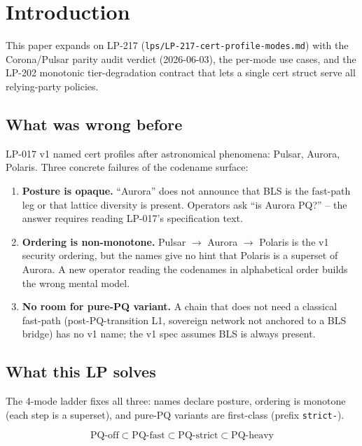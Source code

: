 \section{Introduction}

This paper expands on LP-217
(\texttt{lps/LP-217-cert-profile-modes.md}) with the Corona/Pulsar
parity audit verdict (2026-06-03), the per-mode use cases, and the
LP-202 monotonic tier-degradation contract that lets a single cert
struct serve all relying-party policies.

\subsection{What was wrong before}

LP-017 v1 named cert profiles after astronomical phenomena: Pulsar,
Aurora, Polaris. Three concrete failures of the codename surface:

\begin{enumerate}[leftmargin=2em,nosep]
\item \textbf{Posture is opaque.} ``Aurora'' does not announce that
  BLS is the fast-path leg or that lattice diversity is present.
  Operators ask ``is Aurora PQ?'' -- the answer requires reading
  LP-017's specification text.
\item \textbf{Ordering is non-monotone.} Pulsar $\to$ Aurora $\to$
  Polaris is the v1 security ordering, but the names give no hint
  that Polaris is a superset of Aurora. A new operator reading the
  codenames in alphabetical order builds the wrong mental model.
\item \textbf{No room for pure-PQ variant.} A chain that does not
  need a classical fast-path (post-PQ-transition L1, sovereign
  network not anchored to a BLS bridge) has no v1 name; the v1
  spec assumes BLS is always present.
\end{enumerate}

\subsection{What this LP solves}

The 4-mode ladder fixes all three: names declare posture, ordering
is monotone (each step is a superset), and pure-PQ variants are
first-class (prefix \texttt{strict-}).

\begin{equation}
\textrm{PQ-off} \subset \textrm{PQ-fast} \subset \textrm{PQ-strict}
\subset \textrm{PQ-heavy}
\end{equation}

